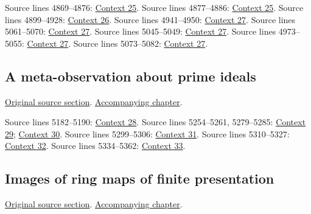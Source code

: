 \begin{AlgebraSourceRoutes}
 Source lines 4869--4876: \hyperlink{algebra-context-025}{Context 25}.
 Source lines 4877--4886: \hyperlink{algebra-context-025}{Context 25}.
 Source lines 4899--4928: \hyperlink{algebra-context-026}{Context 26}.
 Source lines 4941--4950: \hyperlink{algebra-context-027}{Context 27}.
 Source lines 5061--5070: \hyperlink{algebra-context-027}{Context 27}.
 Source lines 5045--5049: \hyperlink{algebra-context-027}{Context 27}.
 Source lines 4973--5055: \hyperlink{algebra-context-027}{Context 27}.
 Source lines 5073--5082: \hyperlink{algebra-context-027}{Context 27}.
\end{AlgebraSourceRoutes}

\subsection{A meta-observation about prime ideals}
\hypertarget{algebra-source-section-oka-families}{}
\noindent\href{https://github.com/stacks/stacks-project/blob/a04446e57ec1fbc252a871afcec7752fb2807b14/algebra.tex\#L5089}{Original source section}. \href{algebra.pdf\#nameddest=section-oka-families}{Accompanying chapter}.

\begin{AlgebraSourceRoutes}
 Source lines 5182--5190: \hyperlink{algebra-context-028}{Context 28}.
 Source lines 5254--5261, 5279--5285: \hyperlink{algebra-context-029}{Context 29}; \hyperlink{algebra-context-030}{Context 30}.
 Source lines 5299--5306: \hyperlink{algebra-context-031}{Context 31}.
 Source lines 5310--5327: \hyperlink{algebra-context-032}{Context 32}.
 Source lines 5334--5362: \hyperlink{algebra-context-033}{Context 33}.
\end{AlgebraSourceRoutes}

\subsection{Images of ring maps of finite presentation}
\hypertarget{algebra-source-section-images-finite-presentation}{}
\noindent\href{https://github.com/stacks/stacks-project/blob/a04446e57ec1fbc252a871afcec7752fb2807b14/algebra.tex\#L5371}{Original source section}. \href{algebra.pdf\#nameddest=section-images-finite-presentation}{Accompanying chapter}.

